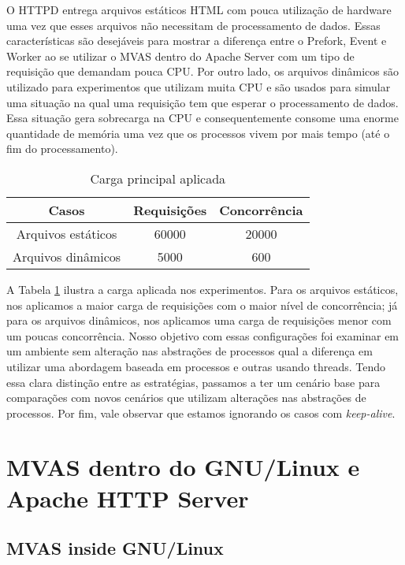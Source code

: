 O HTTPD entrega arquivos estáticos HTML com pouca utilização de hardware uma
vez que esses arquivos não necessitam de processamento de dados. Essas
características são desejáveis para mostrar a diferença entre o Prefork, Event
e Worker ao se utilizar o MVAS dentro do Apache Server com um tipo de
requisição que demandam pouca CPU. Por outro lado, os arquivos dinâmicos são
utilizado para experimentos que utilizam muita CPU e são usados para simular
uma situação na qual uma requisição tem que esperar o processamento de dados.
Essa situação gera sobrecarga na CPU e consequentemente consome uma enorme
quantidade de memória uma vez que os processos vivem por mais tempo (até o fim
do processamento).

\begin{table}[h!]
  \centering
  \begin{tabular}{|c|c|c|}
    \hline
    Casos & \textbf{Requisições} & \textbf{Concorrência}\\
    \hline
    Arquivos estáticos & 60000 & 20000\\
    \hline
    Arquivos dinâmicos & 5000 & 600 \\
    \hline
  \end{tabular}
  \caption{Carga principal aplicada}
  \label{tab:loads}
\end{table}

A Tabela \ref{tab:loads} ilustra a carga aplicada nos experimentos. Para os
arquivos estáticos, nos aplicamos a maior carga de requisições com o maior
nível de concorrência; já para os arquivos dinâmicos, nos aplicamos uma carga
de requisições menor com um poucas concorrência. Nosso objetivo com essas
configurações foi examinar em um ambiente sem alteração nas abstrações de
processos qual a diferença em utilizar uma abordagem baseada em processos e
outras usando threads. Tendo essa clara distinção entre as estratégias,
passamos a ter um cenário base para comparações com novos cenários que utilizam
alterações nas abstrações de processos. Por fim, vale observar que estamos
ignorando os casos com \emph{keep-alive}.

\section{MVAS dentro do GNU/Linux e Apache HTTP Server}
\label{sec:mvas_inside_httpd}

\subsection{MVAS inside GNU/Linux}

